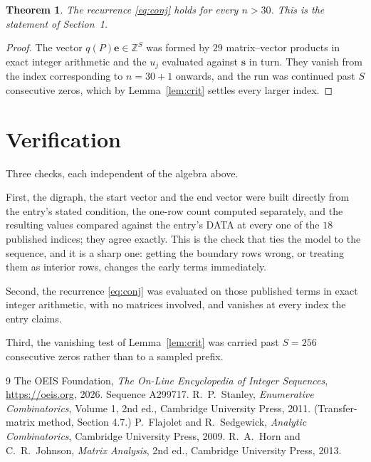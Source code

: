 \documentclass[11pt,a4paper]{article}
\theoremstyle{plain}
\newtheorem{theorem}{Theorem}
\theoremstyle{definition}
\begin{document}
\begin{theorem}
The recurrence \eqref{eq:conj} holds for every $n>30$. This is the statement of
Section~1.
\end{theorem}

\begin{proof}
The vector $q(P)\mathbf{e}\in\mathbb{Z}^{S}$ was formed by $29$ matrix--vector
products in exact integer arithmetic and the $u_j$ evaluated against $\mathbf{s}$ in turn.
They vanish from the index corresponding to $n=30+1$ onwards, and the run was continued
past $S$ consecutive zeros, which by Lemma~\ref{lem:crit} settles every larger index.
\end{proof}

\section{Verification}

Three checks, each independent of the algebra above.

First, the digraph, the start vector and the end vector were built directly from the
entry's stated condition, the one-row count computed separately, and the resulting values
compared against the entry's DATA at every one of the $18$ published indices; they
agree exactly. This is the check that ties the model to the sequence, and it is a sharp one:
getting the boundary rows wrong, or treating them as interior rows, changes the early terms
immediately.

Second, the recurrence \eqref{eq:conj} was evaluated on those published terms in exact
integer arithmetic, with no matrices involved, and vanishes at every index the entry claims.

Third, the vanishing test of Lemma~\ref{lem:crit} was carried past $S=256$ consecutive
zeros rather than to a sampled prefix.

\begin{thebibliography}{9}
 The OEIS Foundation, \emph{The On-Line Encyclopedia of Integer
Sequences}, \url{https://oeis.org}, 2026. Sequence A299717.
 R.~P.~Stanley, \emph{Enumerative Combinatorics}, Volume 1, 2nd ed.,
Cambridge University Press, 2011. (Transfer-matrix method, Section 4.7.)
 P.~Flajolet and R.~Sedgewick, \emph{Analytic Combinatorics}, Cambridge
University Press, 2009.
 R.~A.~Horn and C.~R.~Johnson, \emph{Matrix Analysis}, 2nd ed., Cambridge
University Press, 2013.
\end{thebibliography}
\end{document}
